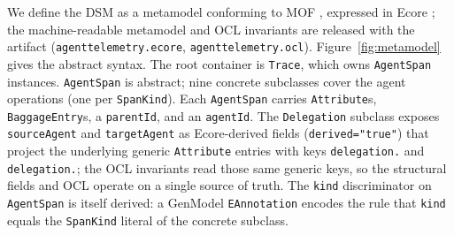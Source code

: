 \documentclass[sigconf,nonacm]{acmart}
\begin{document}
\sloppy
We define the DSM as a metamodel conforming to MOF \cite{omg-mof}, expressed in Ecore \cite{steinberg2008emf}; the machine-readable metamodel and OCL invariants are released with the artifact (\texttt{agenttelemetry.\allowbreak ecore}, \texttt{agenttelemetry.\allowbreak ocl}). Figure~\ref{fig:metamodel} gives the abstract syntax. The root container is \texttt{Trace}, which owns \texttt{AgentSpan} instances. \texttt{AgentSpan} is abstract; nine concrete subclasses cover the agent operations (one per \texttt{SpanKind}). Each \texttt{AgentSpan} carries \texttt{Attribute}s, \texttt{BaggageEntry}s, a \texttt{parentId}, and an \texttt{agentId}. The \texttt{Delegation} subclass exposes \texttt{sourceAgent} and \texttt{targetAgent} as Ecore-derived fields (\texttt{derived="true"}) that project the underlying generic \texttt{Attribute} entries with keys \texttt{delegation.} and \texttt{delegation.}; the OCL invariants read those same generic keys, so the structural fields and OCL operate on a single source of truth. The \texttt{kind} discriminator on \texttt{AgentSpan} is itself derived: a GenModel \texttt{EAnnotation} encodes the rule that \texttt{kind} equals the \texttt{SpanKind} literal of the concrete subclass.
\fussy
\end{document}

